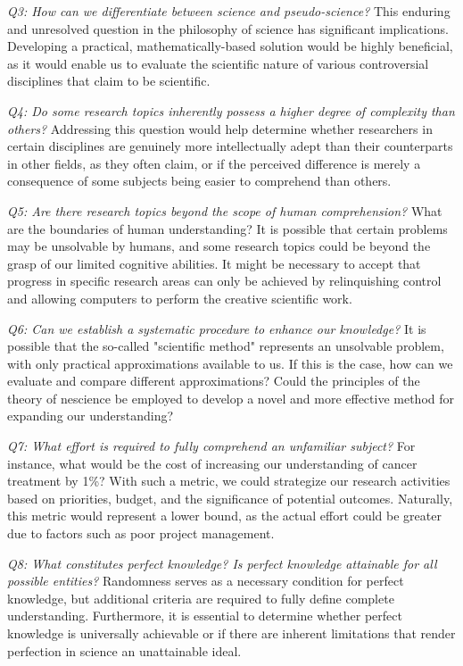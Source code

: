 \emph{Q3: How can we differentiate between science and pseudo-science?} This enduring and unresolved question in the philosophy of science has significant implications. Developing a practical, mathematically-based solution would be highly beneficial, as it would enable us to evaluate the scientific nature of various controversial disciplines that claim to be scientific.

\emph{Q4: Do some research topics inherently possess a higher degree of complexity than others?} Addressing this question would help determine whether researchers in certain disciplines are genuinely more intellectually adept than their counterparts in other fields, as they often claim, or if the perceived difference is merely a consequence of some subjects being easier to comprehend than others.

\emph{Q5: Are there research topics beyond the scope of human comprehension?} What are the boundaries of human understanding? It is possible that certain problems may be unsolvable by humans, and some research topics could be beyond the grasp of our limited cognitive abilities. It might be necessary to accept that progress in specific research areas can only be achieved by relinquishing control and allowing computers to perform the creative scientific work.

\emph{Q6: Can we establish a systematic procedure to enhance our knowledge?} It is possible that the so-called "scientific method" represents an unsolvable problem, with only practical approximations available to us. If this is the case, how can we evaluate and compare different approximations? Could the principles of the theory of nescience be employed to develop a novel and more effective method for expanding our understanding?

\emph{Q7: What effort is required to fully comprehend an unfamiliar subject?} For instance, what would be the cost of increasing our understanding of cancer treatment by 1\%? With such a metric, we could strategize our research activities based on priorities, budget, and the significance of potential outcomes. Naturally, this metric would represent a lower bound, as the actual effort could be greater due to factors such as poor project management.

\emph{Q8: What constitutes perfect knowledge? Is perfect knowledge attainable for all possible entities?} Randomness serves as a necessary condition for perfect knowledge, but additional criteria are required to fully define complete understanding. Furthermore, it is essential to determine whether perfect knowledge is universally achievable or if there are inherent limitations that render perfection in science an unattainable ideal.


